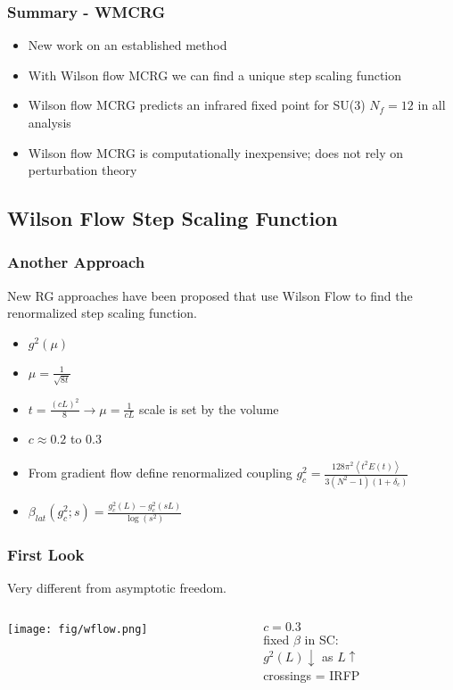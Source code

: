 \begin{frame}
  \frametitle{Summary - WMCRG}
  \begin{itemize}
    \item New work on an established method
    \item With Wilson flow MCRG we can find a unique step scaling function
    \item Wilson flow MCRG predicts an infrared fixed point for SU(3) $N_f=12$ in all analysis
    \item Wilson flow MCRG is computationally inexpensive; does not rely on perturbation theory
  \end{itemize}
\end{frame}

\subsection{Wilson Flow Step Scaling Function}
\addtocounter{framenumber}{-1}

\begin{frame}
  \frametitle{Another Approach}
  New RG approaches have been proposed that use Wilson Flow to find the renormalized step scaling function.
  \begin{itemize}
    \item $g^2(\mu)$
    \item $\mu = \frac{1}{\sqrt{8t}}$
    \item $t = \frac{(cL)^2}{8} \rightarrow \mu = \frac{1}{cL}$ scale is set by the volume
    \item $c\approx 0.2$ to 0.3
    \item From gradient flow define renormalized coupling $g_c^2=\frac{128\pi^2\left<t^2E(t)\right>}{3(N^2-1)(1+\delta_c)}$
    \item $\beta_{lat}(g^2_c; s) = \frac{g^2_c(L) - g^2_c(sL)}{\log(s^2)}$
  \end{itemize}
\end{frame}

\begin{frame}
  \frametitle{First Look}
  Very different from asymptotic freedom.
  \begin{columns}
    \begin{column}{0.65\textwidth}
      \texttt{[image: fig/wflow.png]}
    \end{column}
    \begin{column}{0.35\textwidth}
      \begin{center}
        $c=0.3$\\
        \vspace{24pt}
        fixed $\beta$ in SC:\\
        $g^2(L) \downarrow$ as $L \uparrow$\\
        \vspace{24pt}
        crossings = IRFP
      \end{center}
    \end{column}
  \end{columns}
\end{frame}

